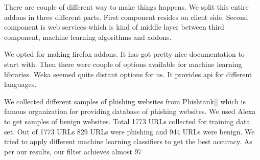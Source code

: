 There are couple of different way to make things happens. We split this entire addons in three different parts. First component resides on client side. Second component is web services which is kind of middle layer between third component, machine learning algorithms and addons. 

We opted for making firefox addons. It has got pretty nice documentation to start with. Then there were couple of options available for machine learning libraries. Weka seemed quite distant options for us. It provides api for different languages.

We collected different samples of phishing websites from Phishtank[] which is famous organization for providing database of phishing websites. We used Alexa to get samples of benign websites. Total 1773 URLs collected for training data set. Out of 1773 URLs 829 URLs were phishing and 944 URLs were benign. We tried to apply different machine learning classifiers to get the best accuracy. As per our results, our filter achieves almost 97%


